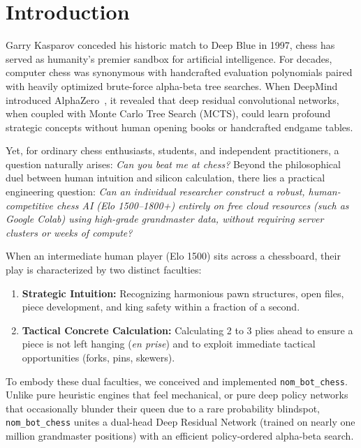 \documentclass[10pt,journal,compsoc]{IEEEtran}
\begin{document}
\maketitle
\IEEEdisplaynontitleabstractindextext
\IEEEpeerreviewmaketitle

\section{Introduction}
 Garry Kasparov conceded his historic match to Deep Blue in 1997, chess has served as humanity's premier sandbox for artificial intelligence. For decades, computer chess was synonymous with handcrafted evaluation polynomials paired with heavily optimized brute-force alpha-beta tree searches. When DeepMind introduced AlphaZero~\cite{silver2018alphazero}, it revealed that deep residual convolutional networks, when coupled with Monte Carlo Tree Search (MCTS), could learn profound strategic concepts without human opening books or handcrafted endgame tables.

Yet, for ordinary chess enthusiasts, students, and independent practitioners, a question naturally arises: \textit{Can you beat me at chess?} Beyond the philosophical duel between human intuition and silicon calculation, there lies a practical engineering question: \textit{Can an individual researcher construct a robust, human-competitive chess AI (Elo 1500--1800+) entirely on free cloud resources (such as Google Colab) using high-grade grandmaster data, without requiring server clusters or weeks of compute?}

When an intermediate human player (Elo 1500) sits across a chessboard, their play is characterized by two distinct faculties:
\begin{enumerate}
    \item \textbf{Strategic Intuition:} Recognizing harmonious pawn structures, open files, piece development, and king safety within a fraction of a second.
    \item \textbf{Tactical Concrete Calculation:} Calculating 2 to 3 plies ahead to ensure a piece is not left hanging (\textit{en prise}) and to exploit immediate tactical opportunities (forks, pins, skewers).
\end{enumerate}

To embody these dual faculties, we conceived and implemented \texttt{nom\_bot\_chess}. Unlike pure heuristic engines that feel mechanical, or pure deep policy networks that occasionally blunder their queen due to a rare probability blindspot, \texttt{nom\_bot\_chess} unites a dual-head Deep Residual Network (trained on nearly one million grandmaster positions) with an efficient policy-ordered alpha-beta search.
\end{document}
